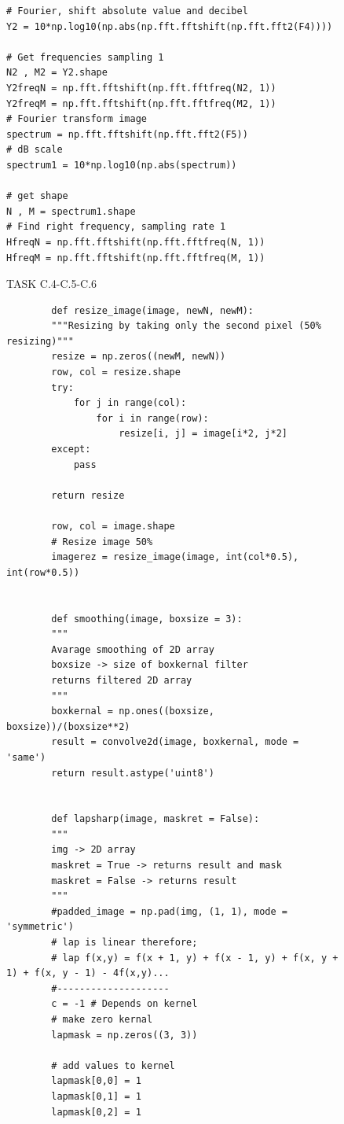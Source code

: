 {\begin{figure}[H]
\begin{lstlisting}
# Fourier, shift absolute value and decibel 
Y2 = 10*np.log10(np.abs(np.fft.fftshift(np.fft.fft2(F4))))

# Get frequencies sampling 1
N2 , M2 = Y2.shape
Y2freqN = np.fft.fftshift(np.fft.fftfreq(N2, 1))
Y2freqM = np.fft.fftshift(np.fft.fftfreq(M2, 1))
# Fourier transform image
spectrum = np.fft.fftshift(np.fft.fft2(F5))
# dB scale
spectrum1 = 10*np.log10(np.abs(spectrum))

# get shape
N , M = spectrum1.shape
# Find right frequency, sampling rate 1
HfreqN = np.fft.fftshift(np.fft.fftfreq(N, 1))
HfreqM = np.fft.fftshift(np.fft.fftfreq(M, 1))
    \end{lstlisting}
\caption{TASK C.4-C.5-C.6}
\label{TASK C.4-C.5-C.6}
\end{figure}

\begin{figure}[H]
    \begin{lstlisting}
        def resize_image(image, newN, newM):
        """Resizing by taking only the second pixel (50% resizing)"""
        resize = np.zeros((newM, newN))
        row, col = resize.shape
        try:
            for j in range(col):
                for i in range(row):
                    resize[i, j] = image[i*2, j*2]
        except:
            pass
    
        return resize

        row, col = image.shape
        # Resize image 50%
        imagerez = resize_image(image, int(col*0.5), int(row*0.5))


        def smoothing(image, boxsize = 3):
        """
        Avarage smoothing of 2D array
        boxsize -> size of boxkernal filter
        returns filtered 2D array
        """
        boxkernal = np.ones((boxsize, boxsize))/(boxsize**2)
        result = convolve2d(image, boxkernal, mode = 'same')
        return result.astype('uint8')


        def lapsharp(image, maskret = False):
        """
        img -> 2D array
        maskret = True -> returns result and mask
        maskret = False -> returns result
        """
        #padded_image = np.pad(img, (1, 1), mode = 'symmetric')
        # lap is linear therefore;
        # lap f(x,y) = f(x + 1, y) + f(x - 1, y) + f(x, y + 1) + f(x, y - 1) - 4f(x,y)...
        #--------------------
        c = -1 # Depends on kernel
        # make zero kernal
        lapmask = np.zeros((3, 3))
        
        # add values to kernel
        lapmask[0,0] = 1
        lapmask[0,1] = 1
        lapmask[0,2] = 1


\end{lstlisting}
\end{figure}}
